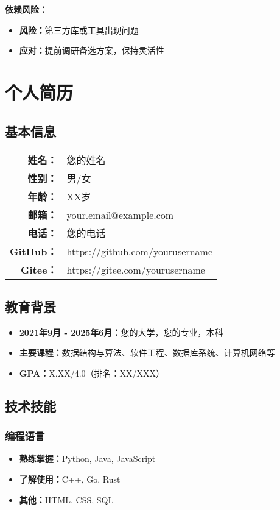 \documentclass[a4paper,12pt]{article}
\makeatletter
\newcommand{\studentname}{您的姓名}
\newcommand{\studentemail}{your.email@example.com}
\newcommand{\studentphone}{您的电话}
\newcommand{\studentuniversity}{您的大学}
\newcommand{\studentmajor}{您的专业}
\makeatother
\begin{document}
\textbf{依赖风险：}
\begin{itemize}
    \item \textbf{风险：}第三方库或工具出现问题
    \item \textbf{应对：}提前调研备选方案，保持灵活性
\end{itemize}

\section{个人简历}

\subsection{基本信息}
\begin{tabular}{rl}
    \textbf{姓名：} & \studentname \\
    \textbf{性别：} & 男/女 \\
    \textbf{年龄：} & XX岁 \\
    \textbf{邮箱：} & \studentemail \\
    \textbf{电话：} & \studentphone \\
    \textbf{GitHub：} & https://github.com/yourusername \\
    \textbf{Gitee：} & https://gitee.com/yourusername \\
\end{tabular}

\subsection{教育背景}
\begin{itemize}
    \item \textbf{2021年9月 - 2025年6月：}\studentuniversity，\studentmajor，本科
    \item \textbf{主要课程：}数据结构与算法、软件工程、数据库系统、计算机网络等
    \item \textbf{GPA：}X.XX/4.0（排名：XX/XXX）
\end{itemize}

\subsection{技术技能}

\subsubsection{编程语言}
\begin{itemize}
    \item \textbf{熟练掌握：}Python, Java, JavaScript
    \item \textbf{了解使用：}C++, Go, Rust
    \item \textbf{其他：}HTML, CSS, SQL
\end{itemize}
\end{document}
